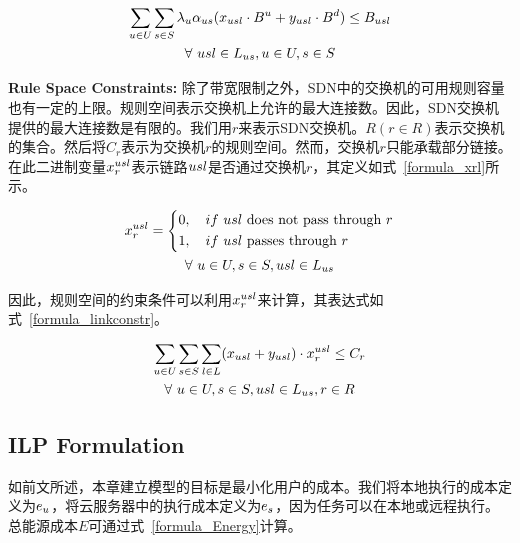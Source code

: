 \begin{equation}
\label{formula_Bandwidth}
\begin{gathered}
\sum\limits_{u \in U} \sum\limits_{s\in S}{\lambda}_{u}{\alpha}_{us}(x_{usl} \cdot B^{u} + y_{usl} \cdot B^{d}) \leq B_{usl}\\
\forall \ usl\in L_{us}, u\in U, s\in S\\
\end{gathered}
\end{equation}

\textbf{Rule Space Constraints:}
除了带宽限制之外，SDN中的交换机的可用规则容量也有一定的上限。规则空间表示交换机上允许的最大连接数。因此，SDN交换机提供的最大连接数是有限的。我们用$r$来表示SDN交换机。$R (r \in R)$表示交换机的集合。然后将$C_r$表示为交换机$r$的规则空间。然而，交换机$r$只能承载部分链接。在此二进制变量$x^{usl}_{r}$表示链路$usl$是否通过交换机$r$，其定义如式~\eqref{formula_xrl}所示。

\begin{equation}
\label{formula_xrl}
\begin{gathered}
\begin{aligned}
x^{usl}_{r} = \left\{\begin{aligned}
& 0,\quad if\ usl \text{ does not pass through }r\\
& 1,\quad if\ usl \text{ passes through }r\\
\end{aligned}
\right.
\end{aligned}
\\\forall \ u \in U, s \in S, usl\in L_{us}\\
\end{gathered}
\end{equation}

因此，规则空间的约束条件可以利用$x^{usl}_{r}$来计算，其表达式如式~\eqref{formula_linkconstr}。

\begin{equation}
\label{formula_linkconstr}
\begin{gathered}
\sum\limits_{u \in U}\sum\limits_{s \in S}\sum\limits_{l \in L}(x_{usl} + y_{usl}) \cdot x^{usl}_{r} \leq C_r\\
\forall\ u \in U, s \in S, usl\in L_{us}, r\in R\\
\end{gathered}
\end{equation}

\subsection{ILP Formulation}
如前文所述，本章建立模型的目标是最小化用户的成本。我们将本地执行的成本定义为$e_u$，将云服务器中的执行成本定义为$e_s$，因为任务可以在本地或远程执行。总能源成本$E$可通过式~\eqref{formula_Energy}计算。

